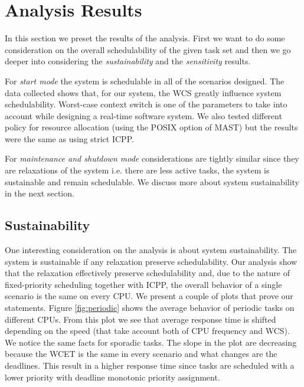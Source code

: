 \documentclass[10pt,a4paper]{report}
\begin{document}
\section{Analysis Results}
In this section we preset the results of the analysis. First we want to do some
consideration on the overall schedulability of the given task set and then we 
go deeper into considering the \emph{sustainability} and the \emph{sensitivity} 
results. 

For \emph{start mode} the system is schedulable in all of the scenarios designed. 
The data collected shows that, for our system, the WCS greatly influence system 
schedulability. Worst-case context switch is one of the parameters to take into 
account while designing a real-time software system. We also tested different 
policy for resource allocation (using the POSIX option of MAST) but the results 
were the same as using strict ICPP.

For \emph{maintenance and shutdown mode} considerations are tightly similar 
since they are relaxations of the system i.e. there are less active tasks, 
the system is sustainable and remain schedulable. 
We discuss more about system sustainability in the next section. 

\subsection{Sustainability}
One interesting consideration on the analysis is about system sustainability. The
system is sustainable if any relaxation preserve schedulability. Our analysis 
show that the relaxation effectively preserve schedulability and, due to the 
nature of fixed-priority scheduling together with ICPP, the overall behavior of 
a single scenario is the same on every CPU. We present a couple of plots that 
prove our statements. Figure \ref{fig:periodic} shows the average behavior of 
periodic tasks on different CPUs. From this plot we see that average response 
time is shifted depending on the speed (that take account both of CPU frequency
and WCS). We notice the same facts for sporadic tasks. The slope in the plot 
are decreasing because the WCET is the same in every scenario and what changes 
are the deadlines. This result in a higher response time since tasks are 
scheduled with a lower priority with deadline monotonic priority assignment.
\end{document}
